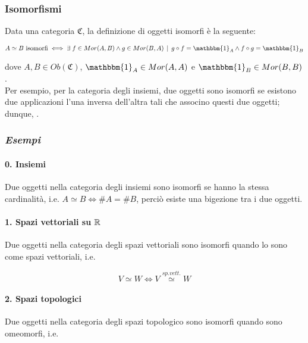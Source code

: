 \subsubsection{Isomorfismi}

Data una categoria $ \mathfrak{C} $, la definizione di oggetti isomorfi è la seguente:

\begin{equation}
	A \simeq B \text{ isomorfi} \iff \E f \in Mor(A,B) \wedge g \in Mor(B,A) \, \mid \, g \circ f = \mathbbm{1}_{A} \wedge f \circ g = \mathbbm{1}_{B}
\end{equation}

dove $ A,B \in Ob(\mathfrak{C}) $, $ \mathbbm{1}_{A} \in Mor(A,A) $ e $ \mathbbm{1}_{B} \in Mor(B,B) $.\\
Per esempio, per la categoria degli insiemi, due oggetti sono isomorfi se esistono due applicazioni l'una inversa dell'altra tali che associno questi due oggetti; dunque, .

\subsubsection{\textit{Esempi}}

\paragraph{0. Insiemi}

Due oggetti nella categoria degli insiemi sono isomorfi se hanno la stessa cardinalità, i.e. $ A \simeq B \iff \# A = \# B $, perciò esiste una bigezione tra i due oggetti.

\paragraph{1. Spazi vettoriali su $ \mathbb{R} $}

Due oggetti nella categoria degli spazi vettoriali sono isomorfi quando lo sono come spazi vettoriali, i.e.

\begin{equation}
	V \simeq W \iff V \stackrel{sp.vett.}{\simeq} W
\end{equation}

\paragraph{2. Spazi topologici}

Due oggetti nella categoria degli spazi topologico sono isomorfi quando sono omeomorfi, i.e.

